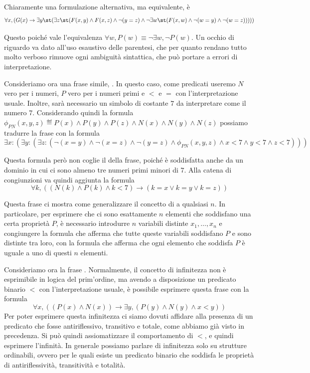 Chiaramente una formulazione alternativa, ma equivalente, è
\[\forall x,( G(x) \to \exists y \st(\exists z\st (F(x,y) \land F(x,z) \land \neg(y = z) \land \neg \exists w\st (F(x,w) \land \neg(w = y) \land \neg(w = z)))))\]

Questo poiché vale l'equivalenza \(\forall w, P(w) \equiv \neg \exists w, \neg P(w)\).
Un occhio di riguardo va dato all'uso esaustivo delle parentesi, che per quanto rendano tutto molto verboso rimuove ogni ambiguità sintattica, che può portare a errori di interpretazione. 

Consideriamo ora una frase simile, . In questo caso, come predicati useremo \(N\) vero per i numeri, \(P\) vero per i numeri primi e \(<\) e \(=\) con l'interpretazione usuale. Inoltre, sarà necessario un simbolo di costante \(7\) da interpretare come il numero \(7\). Considerando quindi la formula \(\phi_{PN}(x,y,z) \eqdef P(x) \land P(y) \land P(z) \land N(x) \land N(y) \land N(z) \) possiamo tradurre la frase con la formula
\[\exists x :(\exists y : (\exists z :(\neg (x=y) \land \neg (x=z) \land \neg (y=z) \land \phi_{PN}(x,y,z) \land x<7 \land y<7 \land z<7)))\]

Questa formula però non coglie il  della frase, poiché è soddisfatta anche da un dominio in cui ci sono almeno tre numeri primi minori di \(7\). Alla catena di congiunzioni va quindi aggiunta la formula
\[\forall k, ((N(k)\land P(k) \land k<7) \to (k=x\lor k=y \lor k=z))\]

Questa frase ci mostra come generalizzare il concetto di  a qualsiasi \(n\). In particolare, per esprimere che ci sono esattamente \(n\) elementi che soddisfano una certa proprietà \(P\), è necessario introdurre \(n\) variabili distinte \(x_1, \dots, x_n\) e congiungere la formula che afferma che tutte queste variabili soddisfano \(P\) e sono distinte tra loro, con la formula che afferma che ogni elemento che soddisfa \(P\) è uguale a uno di questi \(n\) elementi.

Consideriamo ora la frase . Normalmente, il concetto di infinitezza non è esprimibile in logica del prim'ordine, ma avendo a disposizione un predicato binario \(<\) con l'interpretazione usuale, è possibile esprimere questa frase con la formula
\[\forall x,( (P(x) \land N(x)) \to \exists y, (P(y) \land N(y) \land x<y))\]
Per poter esprimere questa infinitezza ci siamo dovuti affidare alla presenza di un predicato che fosse antiriflessivo, transitivo e totale, come abbiamo già visto in precedenza. Si può quindi assiomatizzare il comportamento di \(<\), e quindi esprimere l'infinità. In generale possiamo parlare di infinitezza solo su strutture ordinabili, ovvero per le quali esiste un predicato binario che soddisfa le proprietà di antiriflessività, transitività e totalità.

